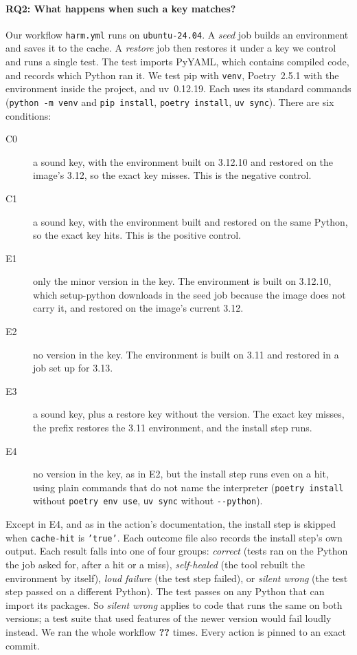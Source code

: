 \documentclass[10pt,a4paper]{article}
\newcommand{\ck}[1]{\textbf{??}}\newcommand{\repourl}{\url{https://github.com/mark124/cache-key-soundness}}%
\begin{document}
\paragraph{RQ2: What happens when such a key matches?}
Our workflow \texttt{harm.yml} runs on \texttt{ubuntu-24.04}. A \emph{seed}
job builds an environment and saves it to the cache. A \emph{restore} job then
restores it under a key we control and runs a single test. The test imports
PyYAML, which contains compiled code, and records which Python ran it. We test
pip with \texttt{venv}, Poetry~2.5.1 with the environment inside the project,
and uv~0.12.19. Each uses its standard commands (\texttt{python -m venv} and
\texttt{pip install}, \texttt{poetry install}, \texttt{uv sync}). There are
six conditions:
\begin{description}
\item[C0] a sound key, with the environment built on 3.12.10 and restored on
  the image's 3.12, so the exact key misses. This is the negative control.
\item[C1] a sound key, with the environment built and restored on the same
  Python, so the exact key hits. This is the positive control.
\item[E1] only the minor version in the key. The environment is built on
  3.12.10, which setup-python downloads in the seed job because the image does
  not carry it, and restored on the image's current 3.12.
\item[E2] no version in the key. The environment is built on 3.11 and
  restored in a job set up for 3.13.
\item[E3] a sound key, plus a restore key without the version. The exact key
  misses, the prefix restores the 3.11 environment, and the install step runs.
\item[E4] no version in the key, as in E2, but the install step runs even on a
  hit, using plain commands that do not name the interpreter
  (\texttt{poetry install} without \texttt{poetry env use}, \texttt{uv sync}
  without \texttt{-{}-python}).
\end{description}
Except in E4, and as in the action's documentation, the install step is
skipped when \texttt{cache-hit} is \texttt{'true'}. Each outcome file also records the
install step's own output. Each result falls into one of four groups:
\emph{correct} (tests ran on the Python the job asked for, after a hit or a
miss),
\emph{self-healed} (the tool rebuilt the environment by itself), \emph{loud
failure} (the test step failed), or \emph{silent wrong} (the test step passed
on a different Python). The test passes on any Python that can import its
packages. So \emph{silent wrong} applies to code that runs the same on both
versions; a test suite that used features of the newer version would fail
loudly instead. We ran the whole workflow \ck{t3.runs} times. Every action is
pinned to an exact commit.
\end{document}

